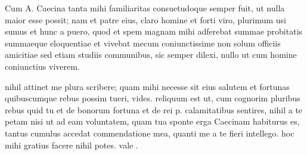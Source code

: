 


 Cum A. Caecina tanta mihi familiaritas consuetudoque semper fuit, ut nulla maior esse possit; nam et patre eius, claro homine et forti viro, plurimum usi sumus et hunc a puero, quod et spem magnam mihi adferebat summae probitatis summaeque eloquentiae et vivebat mecum coniunctissime non solum officiis amicitiae sed etiam studiis communibus, sic semper dilexi, nullo ut cum homine coniunctius viverem.

 nihil attinet me plura scribere; quam mihi necesse sit eius salutem et fortunas quibuscumque rebus possim tueri, vides. reliquum est ut, cum cognorim pluribus rebus quid tu et de bonorum fortuna et de rei p. calamitatibus sentires, nihil a te petam nisi ut ad eam voluntatem, quam tua sponte erga Caecinam habiturus es, tantus cumulus accedat commendatione mea, quanti me a te fieri intellego. hoc mihi gratius facere nihil potes. vale .
